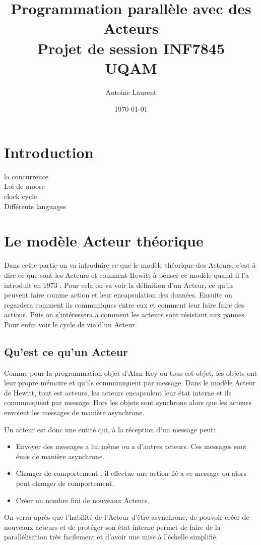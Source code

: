 \documentclass[12pt, a4paper]{article}
\title{Programmation parallèle avec des Acteurs \\ \large{Projet de session INF7845 \\ UQAM}}
\date{\today}
\author{Antoine Laurent}
\begin{document}
\maketitle
\newpage 

\section{Introduction}
la concurrence \\
Loi de moore \\
clock cycle \\
Différents languages \\

\section{Le modèle Acteur théorique}

Dans cette partie on va introduire ce que le modèle théorique des Acteurs, c'est à dire ce que sont les Acteurs et comment Hewitt à penser ce modèle quand il l'a introduit en 1973 \cite{hewitt1973session}. Pour cela on va voir la définition d'un Acteur, ce qu'ils peuvent faire comme action et leur encapsulation des données. Ensuite on regardera comment ils communiques entre eux et comment leur faire faire des actions. Puis on s'intéressera a comment les acteurs sont résistant aux pannes. Pour enfin voir le cycle de vie d'un Acteur.

\subsection{Qu'est ce qu'un Acteur}

Comme pour la programmation objet d'Alan Key ou tous est objet, les objets ont leur propre mémoire et qu'ils communiquent par message. Dans le modèle Acteur de Hewitt, tout est acteurs, les acteurs encapsulent leur état interne et ils communiquent par message. Hors les objets sont synchrone alors que les acteurs envoient les messages de manière asynchrone. 
\par 
Un acteur est donc une entité qui, à la réception d'un message peut: 
\begin{itemize}
\item Envoyer des messages a lui même ou a d'autres acteurs. Ces messages sont émis de manière asynchrone.
\item Changer de comportement : il effectue une action lié a ce message ou alors peut changer de comportement.
\item Créer un nombre fini de nouveaux Acteurs.
\end{itemize}
On verra après que l'habilité de l'Acteur d'être asynchrone, de pouvoir créer de nouveaux acteurs et de protéger son état interne permet de faire de la parallélisation très facilement et d'avoir une mise à l'échelle simplifié.
\end{document}

